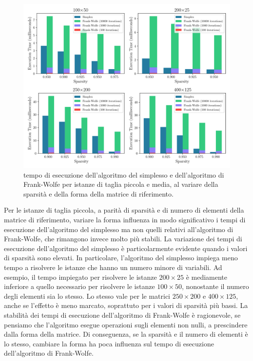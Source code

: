\begin{figure}[!ht]
    \centering
    \includegraphics[width=\textwidth]{assets/figures/timeshape.pdf}
    \caption{tempo di esecuzione dell'algoritmo del simplesso e dell'algoritmo di Frank-Wolfe per istanze di taglia
    piccola e media, al variare della sparsità e della forma della matrice di riferimento.}
    \label{fig:timeshape}
\end{figure}

Per le istanze di taglia piccola, a parità di sparsità e di numero di elementi della matrice di riferimento, variare la
forma influenza in modo significativo i tempi di esecuzione dell'algoritmo del simplesso ma non quelli relativi
all'algoritmo di Frank-Wolfe, che rimangono invece molto più stabili. La variazione dei tempi di esecuzione
dell'algoritmo del simplesso è particolarmente evidente quando i valori di sparsità sono elevati. In particolare,
l'algoritmo del simplesso impiega meno tempo a risolvere le istanze che hanno un numero minore di variabili. Ad esempio,
il tempo impiegato per risolvere le istanze \( 200\times 25 \) è mediamente inferiore a quello necessario per risolvere
le istanze  \( 100\times 50 \), nonostante il numero degli elementi sia lo stesso. Lo stesso vale per le matrici \(
250\times 200 \) e  \( 400\times 125 \), anche se l'effetto è meno marcato, soprattuto per i valori di sparsità più
bassi. La stabilità dei tempi di esecuzione dell'algoritmo di Frank-Wolfe è ragionevole, se pensiamo che l'algoritmo
esegue operazioni sugli elementi non nulli, a prescindere dalla forma della matrice. Di conseguenza, se la sparsità e il
numero di elementi è lo stesso, cambiare la forma ha poca influenza sul tempo di esecuzione dell'algoritmo di
Frank-Wolfe.

